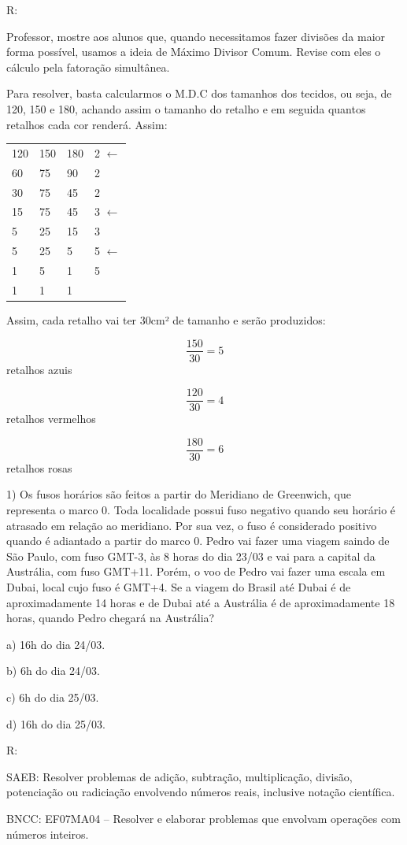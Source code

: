 R:

Professor, mostre aos alunos que, quando necessitamos fazer divisões da
maior forma possível, usamos a ideia de Máximo Divisor Comum. Revise com
eles o cálculo pela fatoração simultânea.

Para resolver, basta calcularmos o M.D.C dos tamanhos dos tecidos, ou
seja, de 120, 150 e 180, achando assim o tamanho do retalho e em seguida
quantos retalhos cada cor renderá. Assim:

\begin{longtable}[]{@{}llll@{}}
\toprule
\endhead
120 & 150 & 180 & 2 \(\leftarrow\)\tabularnewline
60 & 75 & 90 & 2\tabularnewline
30 & 75 & 45 & 2\tabularnewline
15 & 75 & 45 & 3 \(\leftarrow\)\tabularnewline
5 & 25 & 15 & 3\tabularnewline
5 & 25 & 5 & 5 \(\leftarrow\)\tabularnewline
1 & 5 & 1 & 5\tabularnewline
1 & 1 & 1 &\tabularnewline
\bottomrule
\end{longtable}

Assim, cada retalho vai ter 30cm² de tamanho e serão produzidos:

\[\frac{150}{30} = 5\] retalhos azuis

\[\frac{120}{30} = 4\] retalhos vermelhos

\[\frac{180}{30} = 6\] retalhos rosas


1) Os fusos horários são feitos a partir do Meridiano de Greenwich, que
representa o marco 0. Toda localidade possui fuso negativo quando seu
horário é atrasado em relação ao meridiano. Por sua vez, o fuso é
considerado positivo quando é adiantado a partir do marco 0. Pedro vai
fazer uma viagem saindo de São Paulo, com fuso GMT-3, às 8 horas do dia
23/03 e vai para a capital da Austrália, com fuso GMT+11. Porém, o voo
de Pedro vai fazer uma escala em Dubai, local cujo fuso é GMT+4. Se a
viagem do Brasil até Dubai é de aproximadamente 14 horas e de Dubai até
a Austrália é de aproximadamente 18 horas, quando Pedro chegará na
Austrália?

a) 16h do dia 24/03.

b) 6h do dia 24/03.

c) 6h do dia 25/03.

d) 16h do dia 25/03.

R:

SAEB: Resolver problemas de adição, subtração, multiplicação, divisão,
potenciação ou radiciação envolvendo números reais, inclusive notação
científica.

BNCC: EF07MA04 -- Resolver e elaborar problemas que envolvam operações
com números inteiros.

